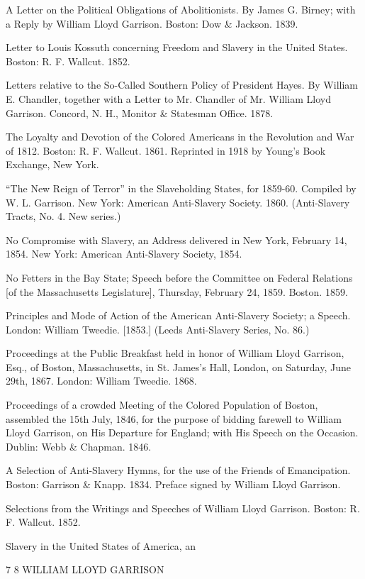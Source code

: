\documentclass{book}
\begin{document}
A Letter on the Political Obligations of Abolitionists. By James G. Birney; with a Reply by William Lloyd Garrison. Boston: Dow \& Jackson. 1839.

Letter to Louis Kossuth concerning Freedom and Slavery in the United States. Boston: R. F. Wallcut. 1852.

Letters relative to the So-Called Southern Policy of President Hayes. By William E. Chandler, together with a Letter to Mr. Chandler of Mr. William Lloyd Garrison. Concord, N. H., Monitor \& Statesman Office. 1878.

The Loyalty and Devotion of the Colored Americans in the Revolution and War of 1812. Boston: R. F. Wallcut. 1861. Reprinted in 1918 by Young’s Book Exchange, New York.

“The New Reign of Terror” in the Slaveholding States, for 1859-60. Compiled by W. L. Garrison. New York: American Anti-Slavery Society. 1860. (Anti-Slavery Tracts, No. 4. New series.)

No Compromise with Slavery, an Address delivered in New York, February 14, 1854. New York: American Anti-Slavery Society, 1854.

No Fetters in the Bay State; Speech before the Committee on Federal Relations {[}of the Massachusetts Legislature{]}, Thursday, February 24, 1859. Boston. 1859.

Principles and Mode of Action of the American Anti-Slavery Society; a Speech. London: William Tweedie. {[}1853.{]} (Leeds Anti-Slavery Series, No. 86.)

Proceedings at the Public Breakfast held in honor of William Lloyd Garrison, Esq., of Boston, Massachusetts, in St. James’s Hall, London, on Saturday, June 29th, 1867. London: William Tweedie. 1868.

Proceedings of a crowded Meeting of the Colored Population of Boston, assembled the 15th July, 1846, for the purpose of bidding farewell to William Lloyd Garrison, on His Departure for England; with His Speech on the Occasion. Dublin: Webb \& Chapman. 1846.

A Selection of Anti-Slavery Hymns, for the use of the Friends of Emancipation. Boston: Garrison \& Knapp. 1834. Preface signed by William Lloyd Garrison.

Selections from the Writings and Speeches of William Lloyd Garrison. Boston: R. F. Wallcut. 1852.

Slavery in the United States of America, an

7 8 WILLIAM LLOYD GARRISON
\end{document}
